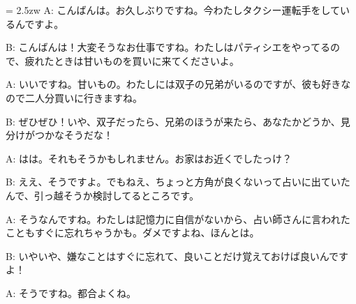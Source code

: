 \documentclass[11pt]{amsart}
\title{}
\author{}
\newenvironment{hangall}[1]{\hangindent = 2.5zw\everypar{\hangindent = 2.5zw}}{}
\begin{document}
\maketitle
\begin{hangall}{}%
A: こんばんは。お久しぶりですね。今わたしタクシー運転手をしているんですよ。



B: こんばんは！大変そうなお仕事ですね。わたしはパティシエをやってるので、疲れたときは甘いものを買いに来てくださいよ。



A: いいですね。甘いもの。わたしには双子の兄弟がいるのですが、彼も好きなので二人分買いに行きますね。



B: ぜひぜひ！いや、双子だったら、兄弟のほうが来たら、あなたかどうか、見分けがつかなそうだな！



A: はは。それもそうかもしれません。お家はお近くでしたっけ？



B: ええ、そうですよ。でもねえ、ちょっと方角が良くないって占いに出ていたんで、引っ越そうか検討してるところです。



A: そうなんですね。わたしは記憶力に自信がないから、占い師さんに言われたこともすぐに忘れちゃうかも。ダメですよね、ほんとは。



B: いやいや、嫌なことはすぐに忘れて、良いことだけ覚えておけば良いんですよ！



A: そうですね。都合よくね。\end{hangall}
\end{document}
